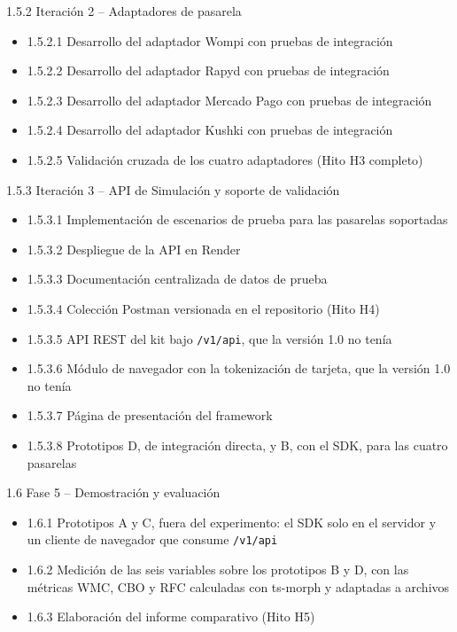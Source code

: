 1.5.2 Iteración 2 – Adaptadores de pasarela

\begin{itemize}
  \item 1.5.2.1 Desarrollo del adaptador Wompi con pruebas de integración
  \item 1.5.2.2 Desarrollo del adaptador Rapyd con pruebas de integración
  \item 1.5.2.3 Desarrollo del adaptador Mercado Pago con pruebas de integración
  \item 1.5.2.4 Desarrollo del adaptador Kushki con pruebas de integración
  \item 1.5.2.5 Validación cruzada de los cuatro adaptadores (Hito H3 completo)
\end{itemize}

1.5.3 Iteración 3 – API de Simulación y soporte de validación

\begin{itemize}
  \item 1.5.3.1 Implementación de escenarios de prueba para las pasarelas soportadas
  \item 1.5.3.2 Despliegue de la API en Render
  \item 1.5.3.3 Documentación centralizada de datos de prueba
  \item 1.5.3.4 Colección Postman versionada en el repositorio (Hito H4)
  \item 1.5.3.5 API REST del kit bajo \texttt{/v1/api}, que la versión 1.0 no tenía
  \item 1.5.3.6 Módulo de navegador con la tokenización de tarjeta, que la versión 1.0 no tenía
  \item 1.5.3.7 Página de presentación del framework
  \item 1.5.3.8 Prototipos D, de integración directa, y B, con el SDK, para las cuatro pasarelas
\end{itemize}

1.6 Fase 5 – Demostración y evaluación

\begin{itemize}
  \item 1.6.1 Prototipos A y C, fuera del experimento: el SDK solo en el servidor y un cliente de navegador que consume \texttt{/v1/api}
  \item 1.6.2 Medición de las seis variables sobre los prototipos B y D, con las métricas WMC, CBO y RFC calculadas con ts-morph y adaptadas a archivos
  \item 1.6.3 Elaboración del informe comparativo (Hito H5)
\end{itemize}

